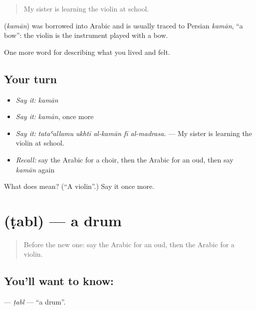 \begin{quote}
My sister is learning the violin at school.
\end{quote}

\begin{cousinweb}
\textbf{} (\emph{kamān}) was borrowed into Arabic and is usually traced to Persian \emph{kamān}, \textquotedblleft{}a bow\textquotedblright{}: the violin is the instrument played with a bow.
\end{cousinweb}

\begin{grammarlens}[title={What you've built}]
One more word for describing what you lived and felt.
\end{grammarlens}

\subsection*{Your turn}
\begin{itemize}
\raggedright
  \item \emph{Say it:} \emph{kamān}
  \item \emph{Say it:} \emph{kamān}, once more
  \item \emph{Say it:} \emph{tataʿallamu ukhtī al-kamān fī al-madrasa.} — My sister is learning the violin at school.
  \item \emph{Recall:} say the Arabic for a choir, then the Arabic for an oud, then say \emph{kamān} again
\end{itemize}

\begin{tcolorbox}[breakable,colback=teal!4,colframe=teal!35!black,title={Before you move on}]
What does  mean? (\textquotedblleft{}A violin\textquotedblright{}.) Say it once more.
\end{tcolorbox}
\section[\texorpdfstring{\ar{طبل} (ṭabl)}{طبل (ṭabl)}]{ (ṭabl) — a drum}

\label{lesson:AR-C544-tabl}



\begin{quote}
Before the new one: say the Arabic for an oud, then the Arabic for a violin.
\end{quote}

\subsection*{You'll want to know: }
\textbf{} — \emph{ṭabl} — \textquotedblleft{}a drum\textquotedblright{}.

